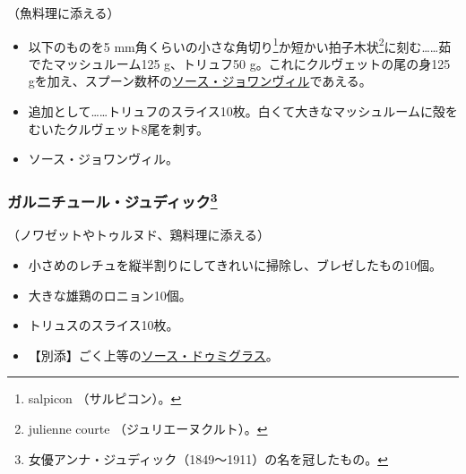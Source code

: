 \begin{recette}


（魚料理に添える）

\begin{itemize}
\item
  以下のものを5 mm角くらいの小さな角切り\footnote{salpicon
    （サルピコン）。}か短かい拍子木状\footnote{julienne courte
    （ジュリエーヌクルト）。}に刻む\ldots{}\ldots{}茹でたマッシュルーム125
  g、トリュフ50 g。これにクルヴェットの尾の身125
  gを加え、スプーン数杯の\protect\hyperlink{sauce-joinville}{ソース・ジョワンヴィル}であえる。
\item
  追加として\ldots{}\ldots{}トリュフのスライス10枚。白くて大きなマッシュルームに殻をむいたクルヴェット8尾を刺す。
\item
  ソース・ジョワンヴィル。
\end{itemize}

\atoaki{}

\hypertarget{garniture-judic}{%
\subsubsection[ガルニチュール・ジュディック]{\texorpdfstring{ガルニチュール・ジュディック\footnote{女優アンナ・ジュディック（1849〜1911）の名を冠したもの。}}{ガルニチュール・ジュディック}}\label{garniture-judic}}



（ノワゼットやトゥルヌド、鶏料理に添える）

\begin{itemize}
\item
  小さめのレチュを縦半割りにしてきれいに掃除し、ブレゼしたもの10個。
\item
  大きな雄鶏のロニョン10個。
\item
  トリュスのスライス10枚。
\item
  【別添】ごく上等の\protect\hyperlink{sauce-demi-glace}{ソース・ドゥミグラス}。
\end{itemize}


\end{recette}
